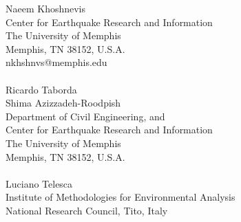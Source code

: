 Naeem Khoshnevis\\
Center for Earthquake Research and Information\\
The University of Memphis\\
Memphis, TN 38152, U.S.A.\\
nkhshnvs@memphis.edu\\
~\\
Ricardo Taborda\\
Shima Azizzadeh-Roodpish\\
Department of Civil Engineering, and\\
Center for Earthquake Research and Information\\
The University of Memphis\\
Memphis, TN 38152, U.S.A.\\
~\\
Luciano Telesca\\
Institute of Methodologies for Environmental Analysis\\
National Research Council, Tito, Italy\\